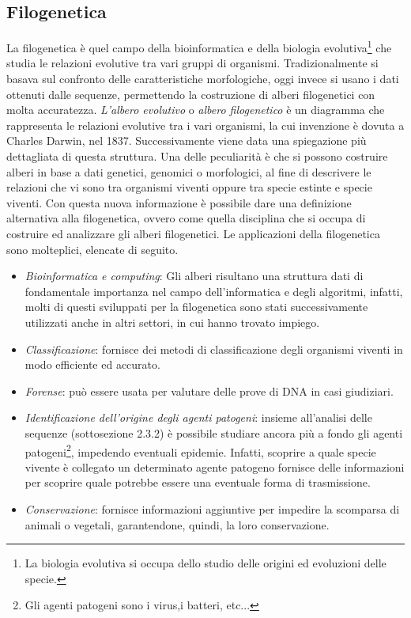 \subsection{Filogenetica}
La filogenetica è quel campo della bioinformatica e della biologia evolutiva\footnote{La biologia evolutiva si occupa dello studio delle origini ed evoluzioni delle specie.} che studia le relazioni evolutive tra vari gruppi di organismi.
Tradizionalmente si basava sul confronto delle caratteristiche morfologiche, oggi invece si usano i dati ottenuti dalle sequenze, permettendo la costruzione di alberi filogenetici con molta accuratezza.
\newline
\textit{L'albero evolutivo} o \textit{albero filogenetico} è un diagramma che rappresenta le relazioni evolutive tra i vari organismi, la cui invenzione è dovuta a Charles Darwin, nel 1837. Successivamente viene data una spiegazione più dettagliata di questa struttura. Una delle peculiarità è che si possono costruire alberi in base a dati genetici, genomici o morfologici, al fine di descrivere le relazioni che vi sono tra organismi viventi oppure tra specie estinte e specie viventi. Con questa nuova informazione è possibile dare una definizione alternativa alla filogenetica, ovvero come quella disciplina che si occupa di costruire ed analizzare gli alberi filogenetici.
\newline
Le applicazioni della filogenetica sono molteplici, elencate di seguito.
\begin{itemize}
	\item \textit{Bioinformatica e computing}: Gli alberi risultano una struttura dati di fondamentale importanza nel campo dell'informatica e degli algoritmi, infatti, molti di questi sviluppati per la filogenetica sono stati successivamente utilizzati anche in altri settori, in cui hanno trovato impiego.
	\item \textit{Classificazione}: fornisce dei metodi di classificazione degli organismi viventi in modo efficiente ed accurato.
	\item \textit{Forense}: può essere usata per valutare delle prove di DNA in casi giudiziari.
	\item \textit{Identificazione dell'origine degli agenti patogeni}: insieme all'analisi delle sequenze (sottosezione 2.3.2) è possibile studiare ancora più a fondo gli agenti patogeni\footnote{Gli agenti patogeni sono i virus,i  batteri, etc...}, impedendo eventuali epidemie. Infatti, scoprire a quale specie vivente è collegato un determinato agente patogeno fornisce delle informazioni per scoprire quale potrebbe essere una eventuale forma di trasmissione.
	\item \textit{Conservazione}: fornisce informazioni aggiuntive per impedire la scomparsa di animali o vegetali, garantendone, quindi, la loro conservazione.
\end{itemize}

